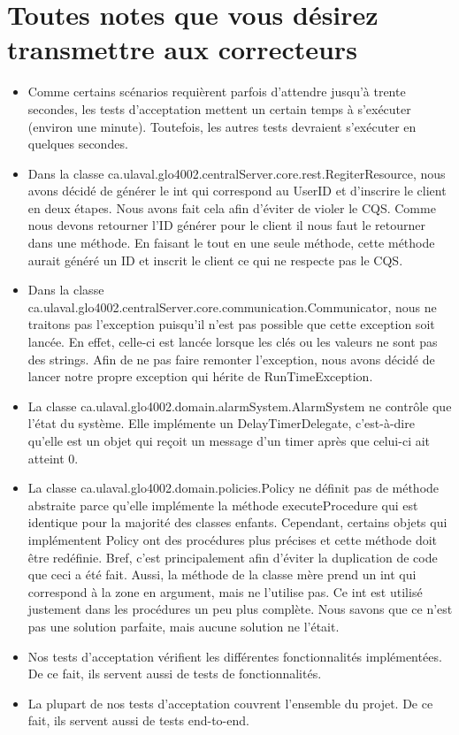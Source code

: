 \section*{Toutes notes que vous désirez transmettre aux correcteurs}
\begin{itemize}
	\item Comme certains scénarios requièrent parfois d'attendre jusqu'à trente secondes, les tests d'acceptation mettent un certain temps à s'exécuter (environ une minute). Toutefois, les autres tests devraient s'exécuter en quelques secondes.
	\item Dans la classe ca.ulaval.glo4002.centralServer.core.rest.RegiterResource, nous avons décidé de générer le int qui correspond au UserID et d'inscrire le client en deux étapes. Nous avons fait cela afin d'éviter de violer le CQS. Comme nous devons retourner l'ID générer pour le client il nous faut le retourner dans une méthode. En faisant le tout en une seule méthode, cette méthode aurait généré un ID et inscrit le client ce qui ne respecte pas le CQS. 
	\item Dans la classe ca.ulaval.glo4002.centralServer.core.communication.Communicator, nous ne traitons pas l'exception puisqu'il n'est pas possible que cette exception soit lancée. En effet, celle-ci est lancée lorsque les clés ou les valeurs ne sont pas des strings. Afin de ne pas faire remonter l'exception, nous avons décidé de lancer notre propre exception qui hérite de RunTimeException.
	\item La classe ca.ulaval.glo4002.domain.alarmSystem.AlarmSystem ne contrôle que l'état du système. Elle implémente un DelayTimerDelegate, c'est-à-dire qu'elle est un objet qui reçoit un message d'un timer après que celui-ci ait atteint 0.
	\item La classe ca.ulaval.glo4002.domain.policies.Policy ne définit pas de méthode abstraite parce qu'elle implémente la méthode executeProcedure qui est identique pour la majorité des classes enfants. Cependant, certains objets qui implémentent Policy ont des procédures plus précises et cette méthode doit être redéfinie. Bref, c'est principalement afin d'éviter la duplication de code que ceci a été fait. Aussi, la méthode de la classe mère prend un int qui correspond à la zone en argument, mais ne l'utilise pas. Ce int est utilisé justement dans les procédures un peu plus complète. Nous savons que ce n'est pas une solution parfaite, mais aucune solution ne l'était.
	\item Nos tests d'acceptation vérifient les différentes fonctionnalités implémentées. De ce fait, ils servent aussi de tests de fonctionnalités.
	\item La plupart de nos tests d'acceptation couvrent l'ensemble du projet. De ce fait, ils servent aussi de tests end-to-end.	
\end{itemize}
